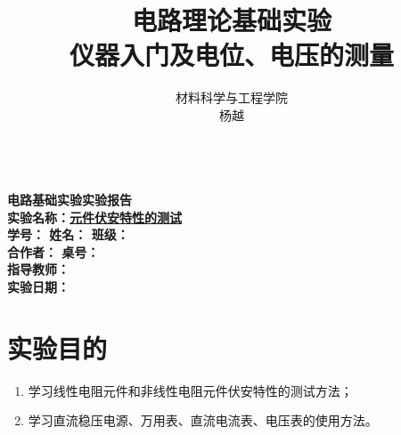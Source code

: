 \documentclass[a4paper]{article}
\title{{\bfseries 电路理论基础实验} \\ \zihao{4}\songti 仪器入门及电位、电压的测量}
\author{材料科学与工程学院\\ 杨越\quad 22301071}
\date{}
\begin{document}
\begin{center}
    {\mbox{}\\[7em]\bfseries\songti%
    电路基础实验实验报告}\\[34mm]
    {\bfseries\songti
    实验名称：\uline{\hfill\mbox{元件伏安特性的测试}\hfill} \\[2.9mm]
    学\quad 号：\uline{}\hfill
    姓\quad 名：\uline{}\hfill
    班\quad 级：\uline{} \\[2.9mm]
    合作者：\uline{}\hspace*{7.4mm}
    桌\quad 号：\uline{}\hfill\mbox{}\\[2.9mm]
    指导教师：\uline{}\hfill\mbox{} \\[2.9mm]
    实验日期：\uline{}\hfill\mbox{} \\[58.7mm]

    }
\end{center}
\newpage

\section{实验目的}
\begin{enumerate}
    \item 学习线性电阻元件和非线性电阻元件伏安特性的测试方法；
    \item 学习直流稳压电源、万用表、直流电流表、电压表的使用方法。
\end{enumerate}
\end{document}
